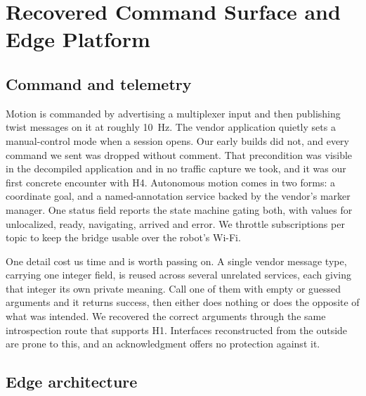 
\section{Recovered Command Surface and Edge Platform}
\label{sec:platform}

\subsection{Command and telemetry}

Motion is commanded by advertising a multiplexer input and then publishing twist messages on it
at roughly \SI{10}{\hertz}. The vendor application quietly sets a manual-control mode when a
session opens. Our early builds did not, and every command we sent was dropped without comment.
That precondition was visible in the decompiled application and in no traffic capture we took,
and it was our first concrete encounter with H4. Autonomous motion comes in two forms: a
coordinate goal, and a named-annotation service backed by the vendor's marker manager. One
status field reports the state machine gating both, with values for unlocalized, ready,
navigating, arrived and error. We throttle subscriptions per topic to keep the bridge usable
over the robot's Wi-Fi.

One detail cost us time and is worth passing on. A single vendor message type, carrying one
integer field, is reused across several unrelated services, each giving that integer its own
private meaning. Call one of them with empty or guessed arguments and it returns success, then
either does nothing or does the opposite of what was intended. We recovered the correct
arguments through the same introspection route that supports H1. Interfaces reconstructed from
the outside are prone to this, and an acknowledgment offers no protection against it.

\subsection{Edge architecture}

